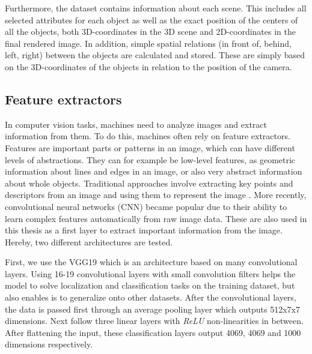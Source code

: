 Furthermore, the dataset contains information about each scene.
This includes all selected attributes for each object as well as the exact position of the centers of all the objects, both 3D-coordinates in the 3D scene and 2D-coordinates in the final rendered image.
In addition, simple spatial relations (in front of, behind, left, right) between the objects are calculated and stored.
These are simply based on the 3D-coordinates of the objects in relation to the position of the camera.

\subsection{Feature extractors}
In computer vision tasks, machines need to analyze images and extract information from them.
To do this, machines often rely on feature extractors.
Features are important parts or patterns in an image, which can have different levels of abstractions.
They can for example be low-level features, as geometric information about lines and edges in an image, or also very abstract information about whole objects.
Traditional approaches involve extracting key points and descriptors from an image and using them to represent the image \citep{Harris1988,Lowe1999,Bay2006}.
More recently, convolutional neural networks (CNN) became popular due to their ability to learn complex features automatically from raw image data.
These are also used in this thesis as a first layer to extract important information from the image. Hereby, two different architectures are tested.

First, we use the VGG19 \citep{Simonyan2015} which is an architecture based on many convolutional layers.
Using 16-19 convolutional layers with small convolution filters helps the model to solve localization and classification tasks on the training dataset, but also enables is to generalize onto other datasets.
After the convolutional layers, the data is passed first through an average pooling layer which outputs 512x7x7 dimensions.
Next follow three linear layers with \emph{ReLU} non-linearities in between.
After flattening the input, these classification layers output 4069, 4069 and 1000 dimensions respectively.

